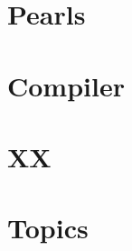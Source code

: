\documentclass[svgnames,12pt,a4paper]{book}
\begin{document}
\chapter{Pearls}



\chapter{Compiler}







\chapter{XX}


\chapter{Topics}




\end{document}
